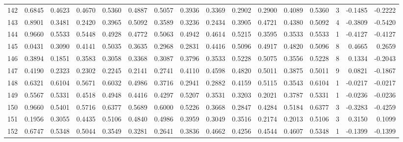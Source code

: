 \begin{tabular}{lrrrrrrrrrrrrrrr}
142 &      0.6845 &  0.4623 &  0.4670 &  0.5360 &  0.4887 &  0.5057 &  0.3936 &  0.3369 &  0.2902 &  0.2900 &   0.4089 &     0.5360 &      3 &                   -0.1485 &                    -0.2222 \\
143 &      0.8901 &  0.3481 &  0.2420 &  0.3965 &  0.5092 &  0.3589 &  0.3236 &  0.2434 &  0.3905 &  0.4721 &   0.4380 &     0.5092 &      4 &                   -0.3809 &                    -0.5420 \\
144 &      0.9660 &  0.5533 &  0.5448 &  0.4928 &  0.4772 &  0.5063 &  0.4942 &  0.4614 &  0.5215 &  0.3595 &   0.3533 &     0.5533 &      1 &                   -0.4127 &                    -0.4127 \\
145 &      0.0431 &  0.3090 &  0.4141 &  0.5035 &  0.3635 &  0.2968 &  0.2831 &  0.4416 &  0.5096 &  0.4917 &   0.4820 &     0.5096 &      8 &                    0.4665 &                     0.2659 \\
146 &      0.3894 &  0.1851 &  0.3583 &  0.3058 &  0.3368 &  0.3087 &  0.3796 &  0.3533 &  0.5228 &  0.5075 &   0.3556 &     0.5228 &      8 &                    0.1334 &                    -0.2043 \\
147 &      0.4190 &  0.2323 &  0.2302 &  0.2245 &  0.2141 &  0.2741 &  0.4110 &  0.4598 &  0.4820 &  0.5011 &   0.3875 &     0.5011 &      9 &                    0.0821 &                    -0.1867 \\
148 &      0.6321 &  0.6104 &  0.5671 &  0.6032 &  0.4986 &  0.3716 &  0.2941 &  0.2882 &  0.4159 &  0.5115 &   0.3543 &     0.6104 &      1 &                   -0.0217 &                    -0.0217 \\
149 &      0.5567 &  0.5331 &  0.4518 &  0.4948 &  0.4416 &  0.4297 &  0.5207 &  0.3531 &  0.3203 &  0.2021 &   0.3787 &     0.5331 &      1 &                   -0.0236 &                    -0.0236 \\
150 &      0.9660 &  0.5401 &  0.5716 &  0.6377 &  0.5689 &  0.6000 &  0.5226 &  0.3668 &  0.2847 &  0.4284 &   0.5184 &     0.6377 &      3 &                   -0.3283 &                    -0.4259 \\
151 &      0.1956 &  0.3055 &  0.4435 &  0.5106 &  0.4840 &  0.4986 &  0.3959 &  0.3049 &  0.3516 &  0.2174 &   0.2013 &     0.5106 &      3 &                    0.3150 &                     0.1099 \\
152 &      0.6747 &  0.5348 &  0.5044 &  0.3549 &  0.3281 &  0.2641 &  0.3836 &  0.4662 &  0.4256 &  0.4544 &   0.4607 &     0.5348 &      1 &                   -0.1399 &                    -0.1399 \\

\end{tabular}
